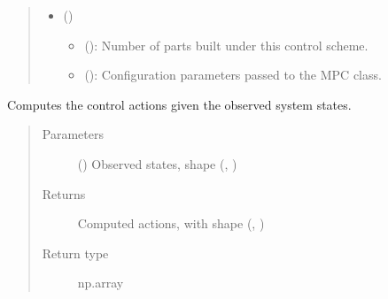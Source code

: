 \documentclass[letterpaper,10pt,english,openany,oneside]{sphinxmanual}
\begin{document}
\begin{fulllineitems}
\begin{quote}
\begin{description}
\begin{itemize}
\item {} 
 () \textendash{} \begin{itemize}
\item {} 
 (): Number of parts built under this control scheme.

\item {} 
 (): Configuration parameters passed to the MPC class.

\end{itemize}


\end{itemize}

\end{description}\end{quote}

\begin{fulllineitems}
\label{\detokenize{_modules/cluster:cluster.Cluster.clearComms}}
\end{fulllineitems}


\begin{fulllineitems}
\label{\detokenize{_modules/cluster:cluster.Cluster.computeAction}}
Computes the control actions given the observed system states.
\begin{quote}\begin{description}
\item[{Parameters}] \leavevmode
{} () \textendash{} Observed states, shape (, )

\item[{Returns}] \leavevmode
Computed actions, with shape (, )

\item[{Return type}] \leavevmode
np.array

\end{description}\end{quote}


\end{fulllineitems}
\end{fulllineitems}
\end{document}
